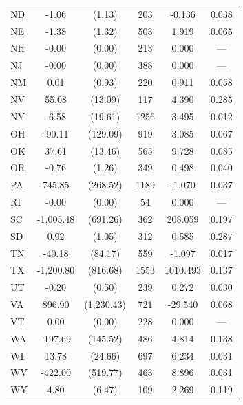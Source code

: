 \begin{tabular}{lccccc}
ND & -1.06 & (1.13) & 203 & -0.136 & 0.038\\
NE & -1.38 & (1.32) & 503 & 1.919 & 0.065\\
NH & -0.00 & (0.00) & 213 & 0.000 & —\\
\addlinespace
NJ & -0.00 & (0.00) & 388 & 0.000 & —\\
NM & 0.01 & (0.93) & 220 & 0.911 & 0.058\\
NV & 55.08 & (13.09) & 117 & 4.390 & 0.285\\
NY & -6.58 & (19.61) & 1256 & 3.495 & 0.012\\
OH & -90.11 & (129.09) & 919 & 3.085 & 0.067\\
\addlinespace
OK & 37.61 & (13.46) & 565 & 9.728 & 0.085\\
OR & -0.76 & (1.26) & 349 & 0.498 & 0.040\\
PA & 745.85 & (268.52) & 1189 & -1.070 & 0.037\\
RI & -0.00 & (0.00) & 54 & 0.000 & —\\
SC & -1,005.48 & (691.26) & 362 & 208.059 & 0.197\\
\addlinespace
SD & 0.92 & (1.05) & 312 & 0.585 & 0.287\\
TN & -40.18 & (84.17) & 559 & -1.097 & 0.017\\
TX & -1,200.80 & (816.68) & 1553 & 1010.493 & 0.137\\
UT & -0.20 & (0.50) & 239 & 0.272 & 0.030\\
VA & 896.90 & (1,230.43) & 721 & -29.540 & 0.068\\
\addlinespace
VT & 0.00 & (0.00) & 228 & 0.000 & —\\
WA & -197.69 & (145.52) & 486 & 4.814 & 0.138\\
WI & 13.78 & (24.66) & 697 & 6.234 & 0.031\\
WV & -422.00 & (519.77) & 463 & 8.896 & 0.031\\
WY & 4.80 & (6.47) & 109 & 2.269 & 0.119\\
\bottomrule
\end{tabular}

